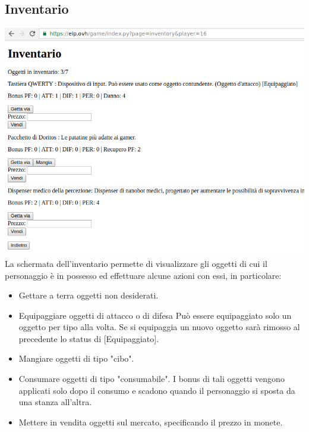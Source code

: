 \documentclass[10pt,a4paper]{article}
\begin{document}
\subsection{Inventario}
\includegraphics[scale=0.5]{6inventario}\\
La schermata dell'inventario permette di visualizzare gli oggetti di cui il personaggio è in possesso ed effettuare alcune azioni con essi, in particolare:
\begin{itemize}
\item Gettare a terra oggetti non desiderati.
\item Equipaggiare oggetti di attacco o di difesa Può essere equipaggiato solo un oggetto per tipo alla volta. Se si equipaggia un nuovo oggetto sarà rimosso al precedente lo status di [Equipaggiato].
\item Mangiare oggetti di tipo "cibo".
\item Consumare oggetti di tipo "consumabile". I bonus di tali oggetti vengono applicati solo dopo il consumo e scadono quando il personaggio si sposta da una stanza all'altra.
\item Mettere in vendita oggetti sul mercato, specificando il prezzo in monete.
\end{itemize}
\end{document}
